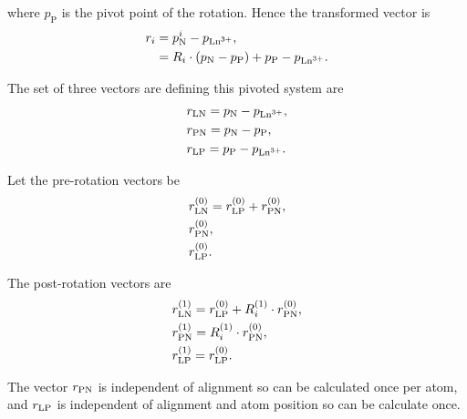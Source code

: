 where $p_\textrm{P}$ is the pivot point of the rotation.
Hence the transformed vector is
\begin{subequations}
\begin{align}
    r_i &= p_\textrm{N}^i - p_{\textrm{Ln}^{3+}} , \\
             &= R_i \cdot \left( p_\textrm{N} - p_\textrm{P} \right) + p_\textrm{P} - p_{\textrm{Ln}^{3+}} . \label{eq: pivoted rotation vector i}
\end{align}
\end{subequations}

The set of three vectors are defining this pivoted system are
\begin{subequations}
\begin{align}
    & r_{\textrm{LN}} = p_\textrm{N} - p_{\textrm{Ln}^{3+}} , \\
    & r_{\textrm{PN}} = p_\textrm{N} - p_\textrm{P} , \\
    & r_{\textrm{LP}} = p_\textrm{P} - p_{\textrm{Ln}^{3+}} .
\end{align}
\end{subequations}

Let the pre-rotation vectors be
\begin{subequations}
\begin{align}
    & r_{\textrm{LN}}^{(0)} = r_{\textrm{LP}}^{(0)} + r_{\textrm{P} \textrm{N}}^{(0)} , \\
    & r_{\textrm{PN}}^{(0)} , \\
    & r_{\textrm{LP}}^{(0)} .
\end{align}
\end{subequations}

The post-rotation vectors are
\begin{subequations}
\begin{align}
    & r_{\textrm{LN}}^{(1)} = r_{\textrm{LP}}^{(0)} + R_i^{(1)} \cdot r_{\textrm{P} \textrm{N}}^{(0)} , \\
    & r_{\textrm{PN}}^{(1)} = R_i^{(1)} \cdot r_{\textrm{P} \textrm{N}}^{(0)}, \\
    & r_{\textrm{LP}}^{(1)} = r_{\textrm{LP}}^{(0)}.
\end{align}
\end{subequations}

The vector $r_{\textrm{PN}}$ is independent of alignment so can be calculated once per atom, and $r_{\textrm{LP}}$ is independent of alignment and atom position so can be calculate once.





